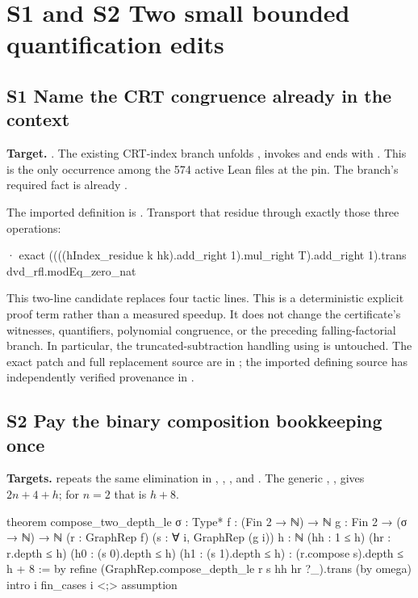 \section{S1 and S2 Two small bounded quantification edits}
\label{sec:supplemental}

\subsection{S1 Name the CRT congruence already in the context}

\textbf{Target.} . The existing
CRT-index branch unfolds , invokes  and ends
with . This is the only  occurrence among the
574 active Lean files at the pin. The branch's required fact is already
.

The imported  definition is
.
Transport that residue through exactly those three operations:
\begin{Lean}
    · exact ((((hIndex_residue k hk).add_right 1).mul_right T).add_right 1).trans
        dvd_rfl.modEq_zero_nat
\end{Lean}

This two-line candidate replaces four tactic lines.
This is a deterministic explicit proof term rather than a measured speedup.
It does not change the certificate's witnesses, quantifiers, polynomial
congruence, or the preceding falling-factorial branch. In particular, the
truncated-subtraction handling using  is untouched. The exact
patch and full replacement source are in ; the
imported defining source has independently verified provenance in
.

\subsection{S2 Pay the binary composition bookkeeping once}

\textbf{Targets.}  repeats the same
 elimination in , ,
,  and . The generic
, ,
gives $2n+4+h$; for $n=2$ that is $h+8$.

\begin{Lean}
theorem compose_two_depth_le {σ : Type*}
    {f : (Fin 2 → ℕ) → ℕ} {g : Fin 2 → (σ → ℕ) → ℕ}
    (r : GraphRep f) (s : ∀ i, GraphRep (g i)) {h : ℕ}
    (hh : 1 ≤ h) (hr : r.depth ≤ h)
    (h0 : (s 0).depth ≤ h) (h1 : (s 1).depth ≤ h) :
    (r.compose s).depth ≤ h + 8 := by
  refine (GraphRep.compose_depth_le r s hh hr ?_).trans (by omega)
  intro i
  fin_cases i <;> assumption
\end{Lean}

